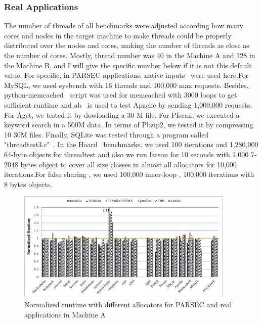 \subsubsection{Real Applications}
\label{sec:synthetic}

The number of threads of all benchmarks were adjusted according how many cores and nodes in the target machine to make threads could be properly distributed over the nodes and cores, making the number of threads as close as the number of cores. Mostly, thread number was 40 in the Machine A and 128 in the Machine B, and I will give the specific number below if it is not this default value. For specific, in PARSEC applications, native inputs~\cite{parsec} were used here.For MySQL, we used sysbench with 16 threads and 100,000 max requests. Besides, python-memcached~\cite{memcached} script was used for memcached with 3000 loops to get sufficient runtime and ab~\cite{apachetest} is used to test Apache by sending 1,000,000 requests. For Aget, we tested it by dowloading a 30 M file. For Pfscan, we executed a keyword search in a 500M data. In terms of Pbzip2, we tested it by compressing 10 30M files. Finally, SQLite was tested through a program called "threadtest3.c"~\cite{sqlitetest}. In the Hoard~\cite{Hoard} benchmarks, we used 100 iterations and 1,280,000 64-byte objects for threadtest and also we run larson for 10 seconds with 1,000 7-2048 bytes object to cover all size classes in almost all allocators for 10,000 iterations.For false sharing , we used 100,000 inner-loop , 100,000 iterations with 8 bytes objects. 

\begin{figure}[H]
    \centering
    \includegraphics[width=\textwidth,height=200]{paper/figure/2-node-parsec-perf.pdf}
    \caption{Normalized runtime with different allocators for PARSEC and real applications in Machine A}
    \label{2node-parsec-perf}
\end{figure}

